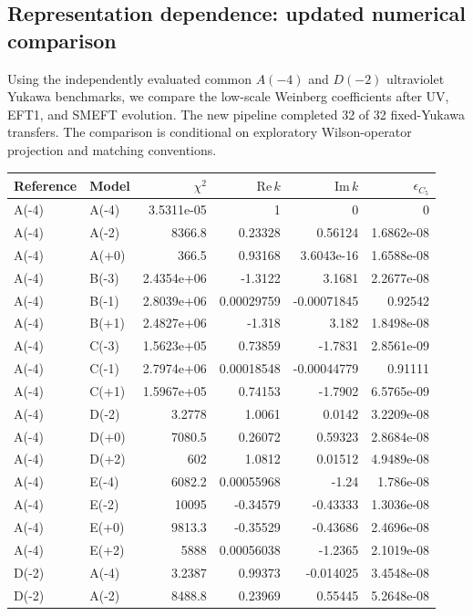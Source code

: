 \subsection*{Representation dependence: updated numerical comparison}
Using the independently evaluated common $A(-4)$ and $D(-2)$ ultraviolet Yukawa benchmarks,
we compare the low-scale Weinberg coefficients after UV, EFT1, and SMEFT evolution.
The new pipeline completed 32 of 32 fixed-Yukawa transfers.
The comparison is conditional on exploratory Wilson-operator projection and matching conventions.
\begin{table}[htbp]
\centering
\scriptsize
\begin{tabular}{llrrrr}
\hline
Reference & Model & $\chi^2$ & $\mathrm{Re}\,k$ & $\mathrm{Im}\,k$ & $\epsilon_{C_5}$ \\
\hline
A(-4) & A(-4) & 3.5311e-05 & 1 & 0 & 0 \\
A(-4) & A(-2) & 8366.8 & 0.23328 & 0.56124 & 1.6862e-08 \\
A(-4) & A(+0) & 366.5 & 0.93168 & 3.6043e-16 & 1.6588e-08 \\
A(-4) & B(-3) & 2.4354e+06 & -1.3122 & 3.1681 & 2.2677e-08 \\
A(-4) & B(-1) & 2.8039e+06 & 0.00029759 & -0.00071845 & 0.92542 \\
A(-4) & B(+1) & 2.4827e+06 & -1.318 & 3.182 & 1.8498e-08 \\
A(-4) & C(-3) & 1.5623e+05 & 0.73859 & -1.7831 & 2.8561e-09 \\
A(-4) & C(-1) & 2.7974e+06 & 0.00018548 & -0.00044779 & 0.91111 \\
A(-4) & C(+1) & 1.5967e+05 & 0.74153 & -1.7902 & 6.5765e-09 \\
A(-4) & D(-2) & 3.2778 & 1.0061 & 0.0142 & 3.2209e-08 \\
A(-4) & D(+0) & 7080.5 & 0.26072 & 0.59323 & 2.8684e-08 \\
A(-4) & D(+2) & 602 & 1.0812 & 0.01512 & 4.9489e-08 \\
A(-4) & E(-4) & 6082.2 & 0.00055968 & -1.24 & 1.786e-08 \\
A(-4) & E(-2) & 10095 & -0.34579 & -0.43333 & 1.3036e-08 \\
A(-4) & E(+0) & 9813.3 & -0.35529 & -0.43686 & 2.4696e-08 \\
A(-4) & E(+2) & 5888 & 0.00056038 & -1.2365 & 2.1019e-08 \\
D(-2) & A(-4) & 3.2387 & 0.99373 & -0.014025 & 3.4548e-08 \\
D(-2) & A(-2) & 8488.8 & 0.23969 & 0.55445 & 5.2648e-08 \\

\end{tabular}
\end{table}
